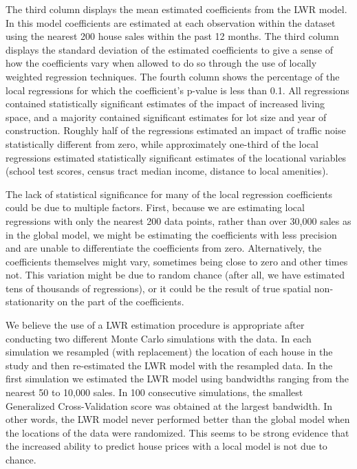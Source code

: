 \documentclass{article}\usepackage{graphicx, color}
\begin{document}
The third column displays the mean estimated coefficients from the LWR model. In this model coefficients are estimated at each observation within the dataset using the nearest 200 house sales within the past 12 months. The third column displays the standard deviation of the estimated coefficients to give a sense of how the coefficients vary when allowed to do so through the use of locally weighted regression techniques. The fourth column shows the percentage of the local regressions for which the coefficient's p-value is less than 0.1. All regressions contained statistically significant estimates of the impact of increased living space, and a majority contained significant estimates for lot size and year of construction. Roughly half of the regressions estimated an impact of traffic noise statistically different from zero, while approximately one-third of the local regressions estimated statistically significant estimates of the locational variables (school test scores, census tract median income, distance to local amenities).

The lack of statistical significance for many of the local regression coefficients could be due to multiple factors. First, because we are estimating local regressions with only the nearest 200 data points, rather than over 30,000 sales as in the global model, we might be estimating the coefficients with less precision and are unable to differentiate the coefficients from zero. Alternatively, the coefficients themselves might vary, sometimes being close to zero and other times not. This variation might be due to random chance (after all, we have estimated tens of thousands of regressions), or it could be the result of true spatial non-stationarity on the part of the coefficients. 

We believe the use of a LWR estimation procedure is appropriate after conducting two different Monte Carlo simulations with the data. In each simulation we resampled (with replacement) the location of each house in the study and then re-estimated the LWR model with the resampled data. In the first simulation we estimated the LWR model using bandwidths ranging from the nearest 50 to 10,000 sales. In 100 consecutive simulations, the smallest Generalized Cross-Validation score was obtained at the largest bandwidth. In other words, the LWR model never performed better than the global model when the locations of the data were randomized. This seems to be strong evidence that the increased ability to predict house prices with a local model is not due to chance. 
\end{document}
